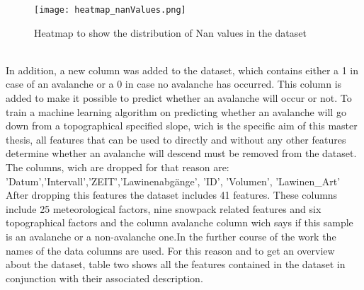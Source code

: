 \documentclass[../masterarbeit.tex]{subfiles}
\begin{document}
\begin{figure}[h]
    \centering
    \texttt{[image: heatmap\_nanValues.png]}
    \caption{Heatmap to show the distribution of Nan values in the dataset}
\end{figure}
\\
In addition, a new column was added to the dataset, which contains either a 1 in case of an avalanche or a 0 in case no avalanche has occurred. This column is added to make it possible to predict  whether an avalanche will occur or not. To train a machine learning algorithm on predicting whether an avalanche will go down from a topographical specified slope, wich is the specific aim of this master thesis, all features that can be used to directly and without any other features determine whether an avalanche will descend must be removed from the dataset.\\
The columns, wich are dropped for that reason are: \\
'Datum','Intervall','ZEIT','Lawinenabgänge', 'ID', 'Volumen', 'Lawinen\_Art'
After dropping this features the dataset includes 41 features. These columns include 25 meteorological factors, nine snowpack related features and six topographical factors and the column avalanche column wich says if this sample is an avalanche or a non-avalanche one.In the further course of the work the names of the data columns are used. For this reason and to get an overview about the dataset, table two shows all the features contained in the dataset in conjunction with their associated description. 
\end{document}
